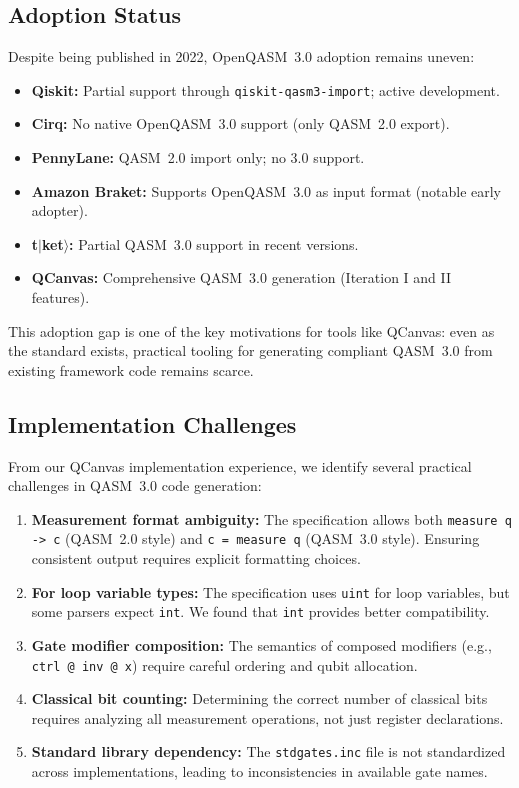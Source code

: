 \documentclass[journal]{IEEEtran}
\begin{document}
\subsection{Adoption Status}

Despite being published in 2022, OpenQASM~3.0 adoption remains uneven:

\begin{itemize}
    \item \textbf{Qiskit:} Partial support through \texttt{qiskit-qasm3-import}; active development.
    \item \textbf{Cirq:} No native OpenQASM~3.0 support (only QASM~2.0 export).
    \item \textbf{PennyLane:} QASM~2.0 import only; no 3.0 support.
    \item \textbf{Amazon Braket:} Supports OpenQASM~3.0 as input format (notable early adopter).
    \item \textbf{t$|$ket$\rangle$:} Partial QASM~3.0 support in recent versions.
    \item \textbf{QCanvas:} Comprehensive QASM~3.0 generation (Iteration I and II features).
\end{itemize}

This adoption gap is one of the key motivations for tools like QCanvas: even as the standard exists, practical tooling for generating compliant QASM~3.0 from existing framework code remains scarce.

\subsection{Implementation Challenges}

From our QCanvas implementation experience, we identify several practical challenges in QASM~3.0 code generation:

\begin{enumerate}
    \item \textbf{Measurement format ambiguity:} The specification allows both \texttt{measure q -> c} (QASM~2.0 style) and \texttt{c = measure q} (QASM~3.0 style). Ensuring consistent output requires explicit formatting choices.

    \item \textbf{For loop variable types:} The specification uses \texttt{uint} for loop variables, but some parsers expect \texttt{int}. We found that \texttt{int} provides better compatibility.

    \item \textbf{Gate modifier composition:} The semantics of composed modifiers (e.g., \texttt{ctrl @ inv @ x}) require careful ordering and qubit allocation.

    \item \textbf{Classical bit counting:} Determining the correct number of classical bits requires analyzing all measurement operations, not just register declarations.

    \item \textbf{Standard library dependency:} The \texttt{stdgates.inc} file is not standardized across implementations, leading to inconsistencies in available gate names.
\end{enumerate}
\end{document}
